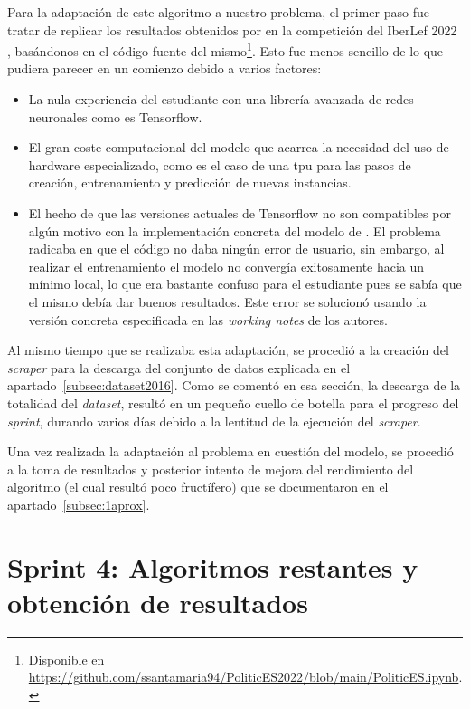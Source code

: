 Para la adaptación de este algoritmo a nuestro problema, el primer paso fue tratar de replicar los resultados obtenidos por \citet{loscalis22} en la competición del IberLef 2022 \citep{iberlef2022}, basándonos en el código fuente del mismo\footnote{Disponible en \url{https://github.com/ssantamaria94/PoliticES2022/blob/main/PoliticES.ipynb}.}. Esto fue menos sencillo de lo que pudiera parecer en un comienzo debido a varios factores:

\begin{itemize}
    \item La nula experiencia del estudiante con una librería avanzada de redes neuronales como es Tensorflow.
    \item El gran coste computacional del modelo que acarrea la necesidad del uso de hardware especializado, como es el caso de una \acrshort{tpu} para las pasos de creación, entrenamiento y predicción de nuevas instancias.
    \item El hecho de que las versiones actuales de Tensorflow no son compatibles por algún motivo con la implementación concreta del modelo de \citet{loscalis22}. El problema radicaba en que el código no daba ningún error de usuario, sin embargo, al realizar el entrenamiento el modelo no convergía exitosamente hacia un mínimo local, lo que era bastante confuso para el estudiante pues se sabía que el mismo debía dar buenos resultados. Este error se solucionó usando la versión concreta especificada en las \textit{working notes} de los autores.
\end{itemize}

Al mismo tiempo que se realizaba esta adaptación, se procedió a la creación del \textit{scraper} para la descarga del conjunto de datos explicada en el apartado~\ref{subsec:dataset2016}. Como se comentó en esa sección, la descarga de la totalidad del \textit{dataset}, resultó en un pequeño cuello de botella para el progreso del \textit{sprint}, durando varios días debido a la lentitud de la ejecución del \textit{scraper}.

Una vez realizada la adaptación al problema en cuestión del modelo, se procedió a la toma de resultados y posterior intento de mejora del rendimiento del algoritmo (el cual resultó poco fructífero) que se documentaron en el apartado~\ref{subsec:1aprox}.

\section{Sprint 4: Algoritmos restantes y obtención de resultados}

